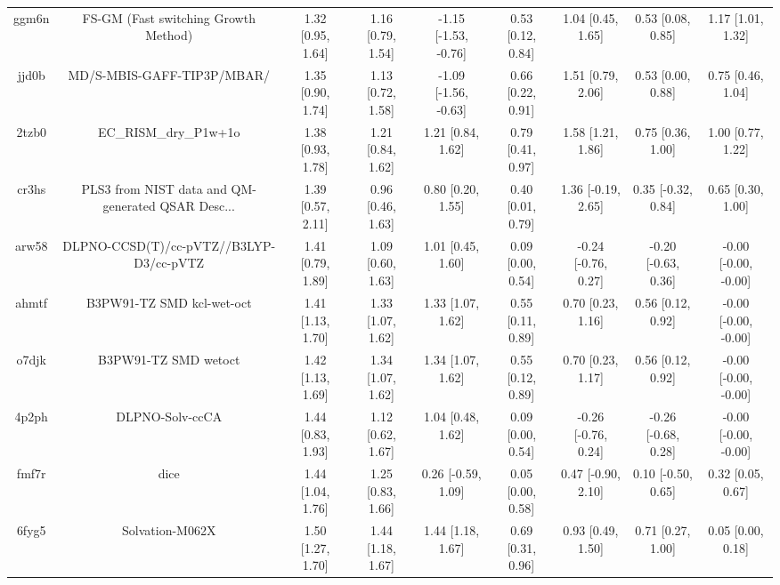 \documentclass{article}
\begin{document}
\begin{center}
\begin{longtable}{|ccccccccc|}
 ggm6n &               FS-GM (Fast switching Growth Method) &  1.32 [0.95, 1.64] &  1.16 [0.79, 1.54] &  -1.15 [-1.53, -0.76] &  0.53 [0.12, 0.84] &    1.04 [0.45, 1.65] &    0.53 [0.08, 0.85] &     1.17 [1.01, 1.32] \\
 jjd0b &                         MD/S-MBIS-GAFF-TIP3P/MBAR/ &  1.35 [0.90, 1.74] &  1.13 [0.72, 1.58] &  -1.09 [-1.56, -0.63] &  0.66 [0.22, 0.91] &    1.51 [0.79, 2.06] &    0.53 [0.00, 0.88] &     0.75 [0.46, 1.04] \\
 2tzb0 &                              EC\_RISM\_dry\_P1w+1o &  1.38 [0.93, 1.78] &  1.21 [0.84, 1.62] &     1.21 [0.84, 1.62] &  0.79 [0.41, 0.97] &    1.58 [1.21, 1.86] &    0.75 [0.36, 1.00] &     1.00 [0.77, 1.22] \\
 cr3hs &  PLS3 from NIST data and QM-generated QSAR Desc... &  1.39 [0.57, 2.11] &  0.96 [0.46, 1.63] &     0.80 [0.20, 1.55] &  0.40 [0.01, 0.79] &   1.36 [-0.19, 2.65] &   0.35 [-0.32, 0.84] &     0.65 [0.30, 1.00] \\
 arw58 &            DLPNO-CCSD(T)/cc-pVTZ//B3LYP-D3/cc-pVTZ &  1.41 [0.79, 1.89] &  1.09 [0.60, 1.63] &     1.01 [0.45, 1.60] &  0.09 [0.00, 0.54] &  -0.24 [-0.76, 0.27] &  -0.20 [-0.63, 0.36] &  -0.00 [-0.00, -0.00] \\
 ahmtf &                          B3PW91-TZ SMD kcl-wet-oct &  1.41 [1.13, 1.70] &  1.33 [1.07, 1.62] &     1.33 [1.07, 1.62] &  0.55 [0.11, 0.89] &    0.70 [0.23, 1.16] &    0.56 [0.12, 0.92] &  -0.00 [-0.00, -0.00] \\
 o7djk &                               B3PW91-TZ SMD wetoct &  1.42 [1.13, 1.69] &  1.34 [1.07, 1.62] &     1.34 [1.07, 1.62] &  0.55 [0.12, 0.89] &    0.70 [0.23, 1.17] &    0.56 [0.12, 0.92] &  -0.00 [-0.00, -0.00] \\
 4p2ph &                                    DLPNO-Solv-ccCA &  1.44 [0.83, 1.93] &  1.12 [0.62, 1.67] &     1.04 [0.48, 1.62] &  0.09 [0.00, 0.54] &  -0.26 [-0.76, 0.24] &  -0.26 [-0.68, 0.28] &  -0.00 [-0.00, -0.00] \\
 fmf7r &                                               dice &  1.44 [1.04, 1.76] &  1.25 [0.83, 1.66] &    0.26 [-0.59, 1.09] &  0.05 [0.00, 0.58] &   0.47 [-0.90, 2.10] &   0.10 [-0.50, 0.65] &     0.32 [0.05, 0.67] \\
 6fyg5 &                                    Solvation-M062X &  1.50 [1.27, 1.70] &  1.44 [1.18, 1.67] &     1.44 [1.18, 1.67] &  0.69 [0.31, 0.96] &    0.93 [0.49, 1.50] &    0.71 [0.27, 1.00] &     0.05 [0.00, 0.18] \\

\end{longtable}
\end{center}
\end{document}
